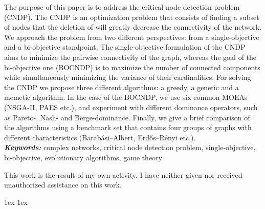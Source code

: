 \documentclass[final]{ubb_dolgozat}
\author{%
Béczi Eliézer
}
\providecommand{\keywords}[1]
{
  \small
  \textbf{\textit{Keywords:}} #1
}
\begin{document}
\maketitle

\begin{abstractEN} %
  {
    \vfill
    The purpose of this paper is to address the critical node detection problem (CNDP).
    The CNDP is an optimization problem that consists of finding a subset of nodes that the deletion of will greatly decrease the connectivity of the network.
    We approach the problem from two different perspectives: from a single-objective and a bi-objective standpoint.
    The single-objective formulation of the CNDP aims to minimize the pairwise connectivity of the graph, whereas the goal of the bi-objective one (BOCNDP) is to maximize the number of connected components while simultaneously minimizing the variance of their cardinalities.
    For solving the CNDP we propose three different algorithms: a greedy, a genetic and a memetic algorithm.
    In the case of the BOCNDP, we use six common MOEAs (NSGA-II, PAES etc.), and experiment with different dominance operators, such as Pareto-, Nash- and Berge-dominance.
    Finally, we give a brief comparison of the algorithms using a benchmark set that contains four groups of graphs with different characteristics (Barabási–Albert, Erdős–Rényi etc.).
    \\[.5cm]
    \keywords{
      complex networks,
      critical node detection problem,
      single-objective,
      bi-objective,
      evolutionary algorithms,
      game theory
    }
    \vfill
  }
  \vspace*{.5cm}
  This work is the result of my own activity. I have neither given nor received unauthorized assistance on this work.
\end{abstractEN}

{
\baselineskip 1ex
\parskip 1ex
\tableofcontents
}












{ \renewcommand{\baselinestretch}{0.8}
  \normalsize
  \setlength{\itemsep}{-2.4mm}
  \setlength{\bibspacing}{0.67\baselineskip}
  
  
}
\end{document}
